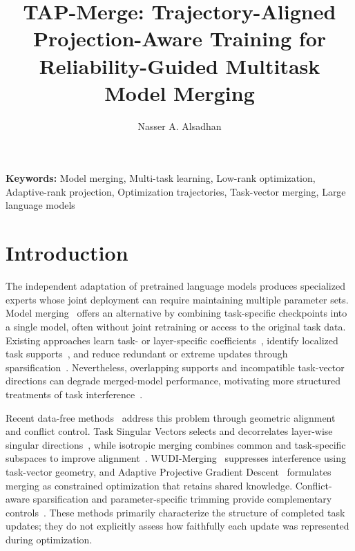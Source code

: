 \documentclass[fleqn,10pt]{wlscirep}
\title{TAP-Merge: Trajectory-Aligned Projection-Aware Training for Reliability-Guided Multitask Model Merging}
\author[1,*]{Nasser A. Alsadhan}
\affil[1]{Department of Computer Science, College of Computer and Information Sciences, King Saud University, Riyadh, 11543, Saudi Arabia}
\affil[*]{Nsadhan@ksu.edu.sa}
\begin{document}
\flushbottom
\maketitle
%
%
\thispagestyle{empty}


\noindent \textbf{Keywords:} Model merging, Multi-task learning, Low-rank optimization, Adaptive-rank projection, Optimization trajectories,
Task-vector merging, Large language models




\section{Introduction}
\label{sec:introduction}

The independent adaptation of pretrained language models produces
specialized experts whose joint deployment can require maintaining
multiple parameter sets. Model merging~\cite{wudi2025,apgdmerging2025} offers an alternative by
combining task-specific checkpoints into a single model, often without
joint retraining or access to the original task
data. Existing approaches learn task- or
layer-specific coefficients~\cite{adamerging2024}, identify localized
task supports~\cite{tallmasks2024}, and reduce redundant or extreme
updates through sparsification~\cite{dare2024,modelbreadcrumbs2024}.
Nevertheless, overlapping supports and incompatible task-vector
directions can degrade merged-model performance, motivating more
structured treatments of task interference~\cite{cabs2025,tsvmerge2025}.

Recent data-free methods~\cite{tsvmerge2025, isotropicmerging2025} address this problem through geometric
alignment and conflict control. Task Singular Vectors selects and
decorrelates layer-wise singular directions~\cite{tsvmerge2025}, while
isotropic merging combines common and task-specific subspaces to
improve alignment~\cite{isotropicmerging2025}. WUDI-Merging~\cite{wudi2025} suppresses
interference using task-vector geometry, and Adaptive
Projective Gradient Descent~\cite{apgdmerging2025} formulates merging as constrained
optimization that retains shared knowledge.
Conflict-aware sparsification and parameter-specific trimming provide
complementary controls~\cite{cabs2025,catmerging2025}. These methods
primarily characterize the structure of completed task updates; they
do not explicitly assess how faithfully each update was represented
during optimization.
\end{document}
